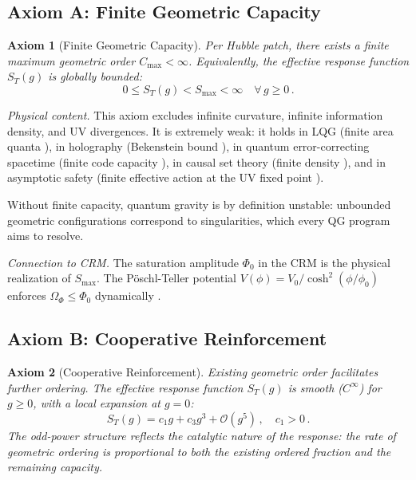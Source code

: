 \documentclass[aps,prd,twocolumn,superscriptaddress,nofootinbib]{revtex4-2}
\newtheorem{axiom}{Axiom}
\begin{document}
\subsection{Axiom A: Finite Geometric Capacity}

\begin{axiom}[Finite Geometric Capacity]
\label{ax:capacity}
Per Hubble patch, there exists a finite maximum geometric order $C_{\max} < \infty$. Equivalently, the effective response function $S_T(g)$ is globally bounded:
\begin{equation}
0 \leq S_T(g) < S_{\max} < \infty \quad \forall\, g \geq 0\,.
\end{equation}
\end{axiom}

\textit{Physical content.} This axiom excludes infinite curvature, infinite information density, and UV divergences. It is extremely weak: it holds in LQG (finite area quanta \cite{Rovelli2004}), in holography (Bekenstein bound \cite{Bekenstein1981}), in quantum error-correcting spacetime (finite code capacity \cite{Almheiri2015}), in causal set theory (finite density \cite{Sorkin2003}), and in asymptotic safety (finite effective action at the UV fixed point \cite{Reuter1998}).

Without finite capacity, quantum gravity is by definition unstable: unbounded geometric configurations correspond to singularities, which every QG program aims to resolve.

\textit{Connection to CRM.} The saturation amplitude $\Phi_0$ in the CRM \cite{Geiger2026} is the physical realization of $S_{\max}$. The P\"oschl-Teller potential $V(\phi) = V_0/\cosh^2(\phi/\phi_0)$ enforces $\Omega_\Phi \leq \Phi_0$ dynamically \cite{Geiger2026c}.

\subsection{Axiom B: Cooperative Reinforcement}

\begin{axiom}[Cooperative Reinforcement]
\label{ax:cooperative}
Existing geometric order facilitates further ordering. The effective response function $S_T(g)$ is smooth ($C^\infty$) for $g \geq 0$, with a local expansion at $g = 0$:
\begin{equation}
S_T(g) = c_1 g + c_3 g^3 + \mathcal{O}(g^5)\,, \quad c_1 > 0\,.
\label{eq:ir_expansion}
\end{equation}
The odd-power structure reflects the catalytic nature of the response: the rate of geometric ordering is proportional to both the existing ordered fraction and the remaining capacity.
\end{axiom}
\end{document}
